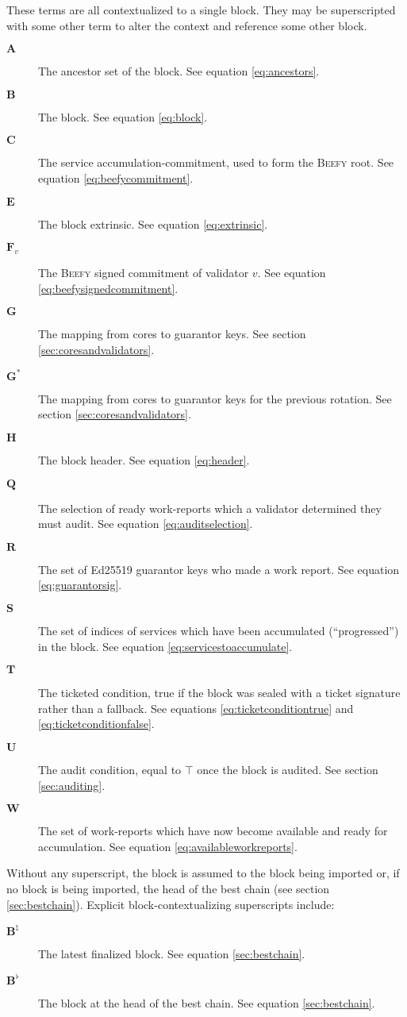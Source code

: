These terms are all contextualized to a single block. They may be superscripted with some other term to alter the context and reference some other block.
\begin{description}
  \item[$\mathbf{A}$] The ancestor set of the block. See equation \ref{eq:ancestors}.
  \item[$\mathbf{B}$] The block. See equation \ref{eq:block}.
  \item[$\mathbf{C}$] The service accumulation-commitment, used to form the \textsc{Beefy} root. See equation \ref{eq:beefycommitment}.
  \item[$\mathbf{E}$] The block extrinsic. See equation \ref{eq:extrinsic}.
  \item[$\mathbf{F}_v$] The \textsc{Beefy} signed commitment of validator $v$. See equation \ref{eq:beefysignedcommitment}.
  \item[$\mathbf{G}$] The mapping from cores to guarantor keys. See section \ref{sec:coresandvalidators}.
  \item[$\mathbf{G^*}$] The mapping from cores to guarantor keys for the previous rotation. See section \ref{sec:coresandvalidators}.
  \item[$\mathbf{H}$] The block header. See equation \ref{eq:header}.
  \item[$\mathbf{Q}$] The selection of ready work-reports which a validator determined they must audit. See equation \ref{eq:auditselection}.
  \item[$\mathbf{R}$] The set of Ed25519 guarantor keys who made a work report. See equation \ref{eq:guarantorsig}.
  \item[$\mathbf{S}$] The set of indices of services which have been accumulated (``progressed'') in the block. See equation \ref{eq:servicestoaccumulate}.
  \item[$\mathbf{T}$] The ticketed condition, true if the block was sealed with a ticket signature rather than a fallback. See equations \ref{eq:ticketconditiontrue} and \ref{eq:ticketconditionfalse}.
  \item[$\mathbf{U}$] The audit condition, equal to $\top$ once the block is audited. See section \ref{sec:auditing}.
  \item[$\mathbf{W}$] The set of work-reports which have now become available and ready for accumulation. See equation \ref{eq:availableworkreports}.
\end{description}

Without any superscript, the block is assumed to the block being imported or, if no block is being imported, the head of the best chain (see section \ref{sec:bestchain}). Explicit block-contextualizing superscripts include:
\begin{description}
  \item[$\mathbf{B}^\natural$] The latest finalized block. See equation \ref{sec:bestchain}.
  \item[$\mathbf{B}^\flat$] The block at the head of the best chain. See equation \ref{sec:bestchain}.
\end{description}

